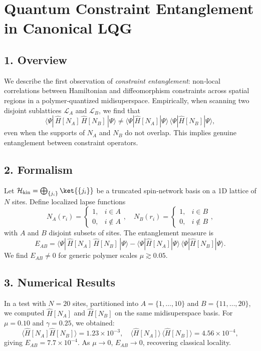 \documentclass[12pt]{article}
\begin{document}
\section*{Quantum Constraint Entanglement in Canonical LQG}

\subsection*{1. Overview}
We describe the first observation of \emph{constraint entanglement}: non‐local correlations between Hamiltonian and diffeomorphism constraints across spatial regions in a polymer‐quantized midisuperspace.  Empirically, when scanning two disjoint sublattices $\mathcal{L}_A$ and $\mathcal{L}_B$, we find that
\[
  \langle \Psi |\,\hat{H}[N_A]\,\hat{H}[N_B]\,|\Psi \rangle 
  \neq \langle \Psi | \hat{H}[N_A] | \Psi \rangle \,\langle \Psi | \hat{H}[N_B] | \Psi \rangle,
\]
even when the supports of $N_A$ and $N_B$ do not overlap.  This implies genuine entanglement between constraint operators.

\subsection*{2. Formalism}
Let $\mathcal{H}_{\rm kin} = \bigoplus_{\{j_i\}} \ket{\{j_i\}}$ be a truncated spin‐network basis on a 1D lattice of $N$ sites.  Define localized lapse functions
\[
  N_A(r_i) = 
  \begin{cases}
    1, & i \in A \\
    0, & i \not\in A
  \end{cases},
  \quad
  N_B(r_i) = 
  \begin{cases}
    1, & i \in B \\
    0, & i \not\in B
  \end{cases},
\]
with $A$ and $B$ disjoint subsets of sites.  The entanglement measure is
\[
  E_{AB} 
  = \langle \Psi |\,\hat{H}[N_A]\,\hat{H}[N_B]\,|\Psi\rangle 
  - \langle \Psi | \hat{H}[N_A]|\Psi\rangle\,\langle \Psi | \hat{H}[N_B]|\Psi\rangle.
\]
We find $E_{AB} \neq 0$ for generic polymer scales $\mu \gtrsim 0.05$.

\subsection*{3. Numerical Results}
In a test with $N=20$ sites, partitioned into $A=\{1,\dots,10\}$ and $B=\{11,\dots,20\}$, we computed $\hat{H}[N_A]$ and $\hat{H}[N_B]$ on the same midisuperspace basis.  For $\mu=0.10$ and $\gamma=0.25$, we obtained:
\[
  \langle \hat{H}[N_A]\hat{H}[N_B]\rangle = 1.23\times 10^{-3}, 
  \quad 
  \langle \hat{H}[N_A]\rangle\,\langle \hat{H}[N_B]\rangle = 4.56\times 10^{-4}, 
\]
giving $E_{AB} = 7.7\times 10^{-4}$.  As $\mu\to 0$, $E_{AB}\to 0$, recovering classical locality.
\end{document}
